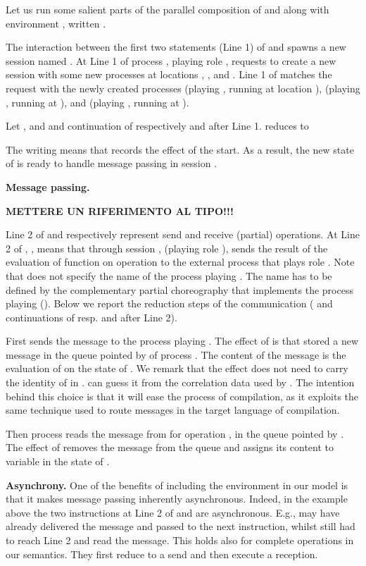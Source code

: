Let us run some salient parts of the parallel composition of  and 
along with environment , written .

The interaction between the first two statements (Line 1) of  and 
spawns a new session named . At Line 1 of  process , playing
role , requests to create a new session with some new processes at
locations , , and . Line 1 of 
matches the request with the newly created processes  (playing , running at location ),  (playing , running at
), and  (playing , running at ).

Let , and  and  continuation of respectively  and 
after Line 1.  reduces to

The writing 
means that  records the effect of the start. As a result, the new state
of  is ready to handle message passing in session .

\textbf{Message passing.}


\textbf{METTERE UN RIFERIMENTO AL TIPO!!!}

Line 2 of  and  respectively represent send and receive (partial)
operations. At Line 2 of , ,
means that through session ,  (playing role ), sends the
result of the evaluation of function  on operation  to the
external process that plays role . Note that  does not specify
the name of the process playing . The name has to be defined by the
complementary partial choreography that implements the process playing
 (). Below we report the reduction steps of the communication
( and  continuations of resp.  and  after Line 2).
{\scriptsize

}
First  sends the message to the process playing . The effect
of  is that
 stored a new message in the queue pointed by  of
process . The content of the message is the evaluation of  on the state of . We remark that the effect does not need to
carry the identity of  in .  can guess it from the
correlation data used by . The intention behind this choice is that
it will ease the process of compilation, as it exploits the same technique
used to route messages in the target language of compilation.

Then process  reads the message from  for operation ,
in the queue pointed by . The effect of  removes the message from the
queue and assigns its content to variable  in the state of .

\textbf{Asynchrony.}
One of the benefits of including the environment in our model is that it
makes message passing inherently asynchronous. Indeed, in the example above
the two instructions at Line 2 of  and  are asynchronous. E.g.,
 may have already delivered the message and passed to the next
instruction, whilst  still had to reach Line 2 and read the message.
This holds also for complete operations in our semantics. They first reduce
to a send and then execute a reception.


